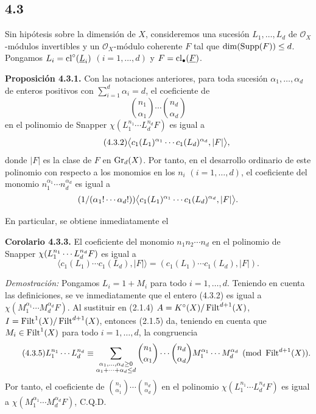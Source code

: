 \subsection*{4.3}
Sin hipótesis sobre la dimensión de \(X\), consideremos una sucesión
\(L_1,\ldots,L_d\) de \(\mathcal O_X\)-módulos invertibles y un
\(\mathcal O_X\)-módulo coherente \(F\) tal que
\(\dim(\Supp(F))\leq d\). Pongamos \(L_i=\cl^\circ(\underline L_i)\)
\((i=1,\ldots,d)\) y \(F=\cl_\bullet(\underline F)\).

\textbf{Proposición 4.3.1.} Con las notaciones anteriores, para toda
sucesión \(\alpha_1,\ldots,\alpha_d\) de enteros positivos con
\(\sum_{i=1}^{d}\alpha_i=d\), el coeficiente de
\[
 \binom{n_1}{\alpha_1}\cdots\binom{n_d}{\alpha_d}
\]
en el polinomio de Snapper \(\chi(L_1^{n_1}\cdots L_d^{n_d}F)\) es igual a
\begin{equation}\tag{4.3.2}
 \bigl\langle c_1(L_1)^{\alpha_1}\cdots \sisi{c_d}{c_1}(L_d)^{\alpha_d},\lvert F\rvert\bigr\rangle, %
\end{equation}
donde \(\lvert F\rvert\) es la clase de \(F\) en \(\Gr_d(X)\). Por tanto,
en el desarrollo ordinario de este polinomio con respecto a los monomios en
los \(n_i\) \((i=1,\ldots,d)\), el coeficiente del monomio
\(n_1^{\alpha_1}\cdots n_d^{\alpha_d}\) es igual a
\[
 (1/(\alpha_1! \cdots \sisi{a_d}{\alpha_d}!)) %
 \bigl\langle c_1(L_1)^{\alpha_1}\cdots c_1(L_d)^{\alpha_d},\lvert F\rvert\bigr\rangle.
\]

En particular, se obtiene inmediatamente el

\textbf{Corolario 4.3.3.} El coeficiente del monomio \(n_1n_2\cdots n_d\)
en el polinomio de Snapper
\(\chi(L_1^{\sisi{\alpha_1}{n_1}}\cdots L_d^{\sisi{\alpha_d}{n_d}}F)\) es igual a %
\begin{equation}\tag{4.3.4}
 \bigl\langle c_1(L_1)\cdots c_1(L_d),\lvert F\rvert\bigr\rangle
 =
 (c_1(L_1)\cdots c_1(L_d),\lvert F\rvert).
\end{equation}

\emph{Demostración:} Pongamos \(L_i=1+M_i\) para todo \(i=1,\ldots,d\).
Teniendo en cuenta las definiciones, se ve inmediatamente que el entero
(4.3.2) es igual a \(\chi(M_1^{\alpha_1}\cdots M_d^{\alpha_d}F)\). Al
sustituir en (2.1.4)
\(A=K^\circ(X)/\Filt^{d+1}(X)\),
\(I=\Filt^1(X)/\Filt^{d+1}(X)\), entonces (2.1.5) da, teniendo en cuenta que
\(M_i\in\Filt^1(X)\) para todo \(i=1,\ldots,d\), la congruencia
\begin{equation}\tag{4.3.5}
 L_1^{n_1}\cdots L_d^{n_d}
 \equiv
 \sum_{\substack{\alpha_1,\ldots,\alpha_d\geq0\\ \alpha_1+\cdots+\alpha_d\sisi{=}{\leq}d}} %
 \binom{n_1}{\alpha_1}\cdots\binom{n_d}{\alpha_d}
 M_1^{\alpha_1}\cdots M_d^{\alpha_d}
 \pmod{\Filt^{d+1}(X)}.
\end{equation}
Por tanto, el coeficiente de
\(\binom{n_1}{\alpha_1}\cdots\binom{n_d}{\alpha_d}\) en el polinomio
\(\chi(L_1^{n_1}\cdots L_d^{n_d}F)\) es igual a
\(\chi(M_1^{\alpha_1}\cdots M_d^{\alpha_d}F)\), C.Q.D.

